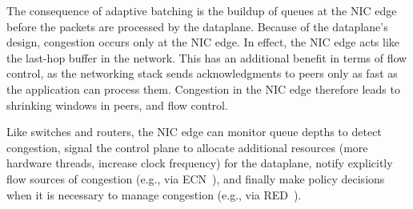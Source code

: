 

 The consequence of adaptive
batching is the buildup of queues at the NIC edge before the packets
are processed by the dataplane.  Because of the dataplane's design,
congestion occurs only at the NIC edge.  In effect, the NIC edge acts
like the last-hop buffer in the network.  This has an additional
benefit in terms of flow control, as the networking stack sends
acknowledgments to peers only as fast as the application can process
them.  Congestion in the NIC edge therefore leads to shrinking windows
in peers, and flow control.


Like switches and routers, the NIC edge can
monitor queue depths to detect congestion, signal the control plane to
allocate additional resources (more hardware threads, increase clock
frequency) for the dataplane, notify explicitly flow sources of
congestion (e.g., via ECN~\cite{ramakrishnan2001addition}), and finally make
policy decisions when it is necessary to manage congestion (e.g., via RED~\cite{DBLP:journals/ton/FloydJ93}).


